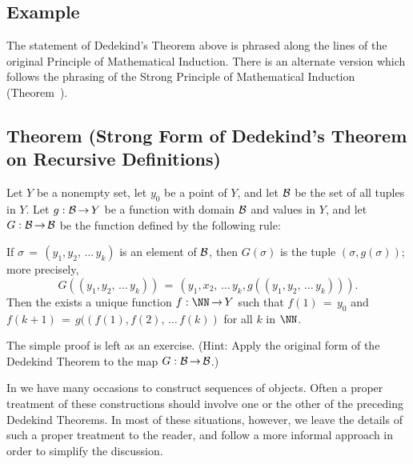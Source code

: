 {\V
\V

        \subsection{\small{{\bf Example}}}
        \label{ExampA40.110}

\V
\V

        The statement of Dedekind's Theorem above is phrased along the lines of the original Principle of Mathematical Induction.
    There is an alternate version which follows the phrasing of the Strong Principle of Mathematical Induction (Theorem~).

\V

        \subsection{\small{{\bf Theorem}} (Strong Form of Dedekind's Theorem on Recursive Definitions)}
        \label{ThmA40.120}


        Let $Y$ be a nonempty set, let $y_{0}$ be a point of $Y$, and let ${\cal B}$ be the set of all tuples in $Y$.
    Let $g:{\cal B} \,{\rightarrow}\, Y$ be a function with domain ${\cal B}$ and values in $Y$,
    and let $G:{\cal B} \,{\rightarrow}\, {\cal B}$ be the function defined by the following rule:

        If ${\sigma} \,=\, (y_{1},y_{2},\,{\ldots}\,y_{k})$ is an element of ${\cal B}$, then $G({\sigma})$ is the tuple $({\sigma},g({\sigma}))$;
    more precisely,
        \begin{displaymath}
        G((y_{1},y_{2},\,{\ldots}\,y_{k})) \,=\, (y_{1},x_{2},\,{\ldots}\,y_{k}, g((y_{1},y_{2},\,{\ldots}\,y_{k}))).
        \end{displaymath}
    Then the exists a unique function $f:{\NN} \,{\rightarrow}\, Y$ such that $f(1) \,=\, y_{0}$ and $f(k+1) \,=\, g((f(1),f(2),\,{\ldots}\,f(k))$ for all $k$ in ${\NN}$.

\V

        The simple proof is left as an exercise. (Hint: Apply the original form of the Dedekind Theorem to the map $G:{\cal B} \,{\rightarrow}\, {\cal B}$.)

\V
\V



        In {\TheseNotes} we have many occasions to construct sequences of objects.
    Often a proper treatment of these constructions should involve one or the other of the preceding Dedekind Theorems.
    In most of these situations, however, we leave the details of such a proper treatment to the reader,
    and follow a more informal approach in order to simplify the discussion.




}

